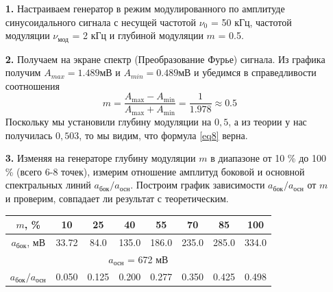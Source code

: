 \documentclass[a4paper,12pt]{article}
\theoremstyle{definition}
\begin{document}
\begin{enumerate}


\item [\textbf{1.}] Настраиваем генератор в режим модулированного по амплитуде синусоидального сигнала с несущей частотой $\nu_0$ = 50 кГц, частотой модуляции $\nu_\text{мод}$ = 2 кГц и глубиной модуляции $m$ = 0.5.

\item [\textbf{2.}] Получаем на экране спектр (Преобразование Фурье) сигнала. Из графика получим $A_{max} = 1.489 \text{мВ}$ и $A_{min} = 0.489 \text{мВ}$ и убедимся в справедливости соотношения $$ m = \frac{A_\text{max} - A_\text{min}}{A_\text{max} + A_\text{min}} = \frac{1}{1.978} \approx 0.5 $$
Поскольку мы установили глубину модуляции на $0,5$, а из теории у нас получилась $0,503$, то мы видим, что формула \ref{eq8} верна.

\item [\textbf{3.}]
Изменяя на генераторе глубину модуляции $m$ в диапазоне от 10 \% до 100 \% (всего 6-8 точек), измерим отношение амплитуд боковой и основной 
спектральных линий $a_{\text{бок}}/a_{\text{осн}}$. Построим график зависимости $a_{\text{бок}}/a_{\text{осн}}$ от $m$ и проверим, совпадает ли 
результат с теоретическим.

\begin{center}
\begin{tabular}{|c|c|c|c|c|c|c|c|}
\hline
$m$, \% & 10 & 25 & 40 & 55 & 70 & 85 & 100 \\ \hline
$a_{\text{бок}}$, мВ & 33.72 & 84.0 & 135.0 & 186.0 & 235.0 & 285.0 & 334.0 \\ \hline
\multicolumn{8}{|c|}{$a_{\text{осн}}$ = 672 мВ} \\ \hline
$a_{\text{бок}}/a_{\text{осн}}$ & 0.050 & 0.125 & 0.200 & 0.277 & 0.350 & 0.425 & 0.498 \\ \hline
\end{tabular}


\end{center}
\end{enumerate}
\end{document}
